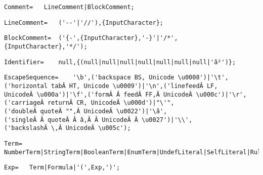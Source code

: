 \documentclass{article}
\begin{document}
    \begin{flushleft}
    \begin{lstlisting}[mathescape=true, breaklines=true]
     Comment= 	LineComment|BlockComment;
    \end{lstlisting}
    \end{flushleft}
    \begin{flushleft}
    \begin{lstlisting}[mathescape=true, breaklines=true]
     LineComment= 	('--'|'//'),{InputCharacter};
    \end{lstlisting}
    \end{flushleft}
    \begin{flushleft}
    \begin{lstlisting}[mathescape=true, breaklines=true]
     BlockComment= 	('{-',{InputCharacter},'-}'|'/*',{InputCharacter},'*/');
    \end{lstlisting}
    \end{flushleft}
    \begin{flushleft}
    \begin{lstlisting}[mathescape=true, breaklines=true]
     Identifier= 	null,{(null|null|null|null|null|null|null|'â²')};
    \end{lstlisting}
    \end{flushleft}
    \begin{flushleft}
    \begin{lstlisting}[mathescape=true, breaklines=true]
     EscapeSequence= 	'\b',('backspace BS, Unicode \u0008')|'\t',('horizontal tabÂ HT, Unicode \u0009')|'\n',('linefeedÂ LF, UnicodeÂ \u000a')|'\f',('formÂ Â feedÂ FF,Â UnicodeÂ \u000c')|'\r',('carriageÂ returnÂ CR, UnicodeÂ \u000d')|"\'",('doubleÂ quoteÂ "",Â UnicodeÂ \u0022')|'\â',('singleÂ Â quoteÂ Â â,Â Â UnicodeÂ Â \u0027')|'\\',('backslashÂ \,Â UnicodeÂ \u005c');
    \end{lstlisting}
    \end{flushleft}
    \begin{flushleft}
    \begin{lstlisting}[mathescape=true, breaklines=true]
     Term= 	NumberTerm|StringTerm|BooleanTerm|EnumTerm|UndefLiteral|SelfLiteral|RuleAsTerm|ValueTerm|StructureTerm;
    \end{lstlisting}
    \end{flushleft}
    \begin{flushleft}
    \begin{lstlisting}[mathescape=true, breaklines=true]
     Exp= 	Term|Formula|'(',Exp,')';
    \end{lstlisting}
    \end{flushleft}
\end{document}
